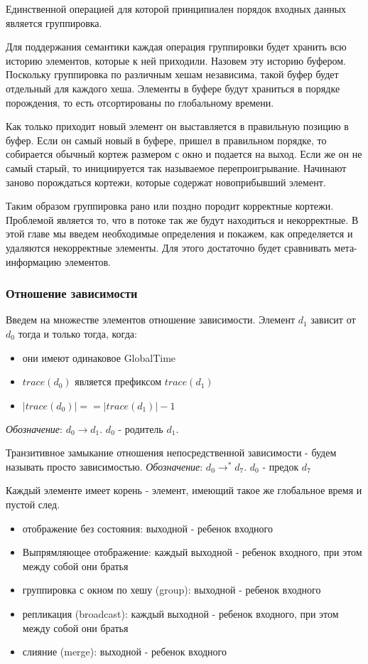 \documentclass[14pt]{matmex-diploma-custom}
\begin{document}
Единственной операцией для которой принципиален порядок входных данных является группировка.

Для поддержания семантики каждая операция группировки будет хранить всю историю элементов, которые к ней приходили. Назовем эту историю буфером. Поскольку группировка по различным хешам независима, такой буфер будет отдельный для каждого хеша. Элементы в буфере будут храниться в порядке порождения, то есть отсортированы по глобальному времени.

Как только приходит новый элемент он выставляется в правильную позицию в буфер. Если он самый новый в буфере, пришел в правильном порядке, то собирается обычный кортеж размером с окно и подается на выход. Если же он не самый старый, то инициируется так называемое перепроигрывание. Начинают заново порождаться кортежи, которые содержат новоприбывший элемент.

Таким образом группировка рано или поздно породит корректные кортежи. Проблемой является то, что в потоке так же будут находиться и некорректные. В этой главе мы введем необходимые определения и покажем, как определяется и удаляются некорректные элементы. Для этого достаточно будет сравнивать мета-информацию элементов.

\subsubsection{Отношение зависимости}

Введем на множестве элементов отношение зависимости. Элемент \(d_1\) зависит от \(d_0\) тогда и только тогда, когда:

\begin{itemize}
  \item они имеют одинаковое GlobalTime
  \item \(trace(d_0)\) является префиксом \(trace(d_1)\)
  \item \(|trace(d_0)| == |trace(d_1)| - 1\)
\end{itemize}

\textit{Обозначение}: \(d_0 \rightarrow d_1\). \(d_0\) - родитель \(d_1\).

Транзитивное замыкание отношения непосредственной зависимости - будем называть просто зависимостью. \textit{Обозначение}: \(d_0 \rightarrow^* d_7\). \(d_0\) - предок \(d_7\)

Каждый элементе имеет корень - элемент, имеющий такое же глобальное время и пустой след.

\begin{itemize}
  \item отображение без состояния: выходной - ребенок входного
  \item Выпрямляющее отображение: каждый выходной - ребенок входного, при этом между собой они братья
  \item группировка с окном по хешу (group): выходной - ребенок входного
  \item репликация (broadcast): каждый выходной - ребенок входного, при этом между собой они братья
  \item слияние (merge): выходной - ребенок входного
\end{itemize}

\setmonofont[Mapping=tex-text]{CMU Typewriter Text}


\end{document}
